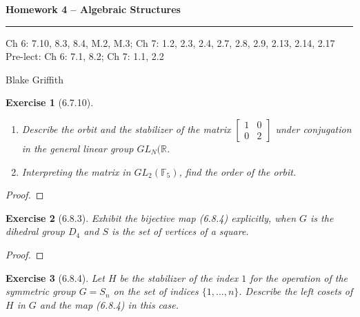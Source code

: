 \documentclass[12pt]{article}
\newtheorem*{exer}{Exercise}
\begin{document}
\textbf{Homework 4 -- Algebraic Structures} \\

\hrule

\begin{minipage}{.80\linewidth}
    \flushleft
    Ch 6: 7.10, 8.3, 8.4, M.2, M.3; Ch 7: 1.2, 2.3, 2.4, 2.7, 2.8, 2.9,
    2.13, 2.14, 2.17 \\
    Pre-lect: Ch 6: 7.1, 8.2; Ch 7: 1.1, 2.2 \\
\end{minipage}
\begin{minipage}{.20\linewidth}
    \flushright
    Blake Griffith
\end{minipage}

\begin{exer}[6.7.10]
    \begin{enumerate}
        \item Describe the orbit and the stabilizer of the matrix
            $\left[
                \begin{array}{cc}
                    1 & 0 \\
                    0 & 2 
                \end{array}
            \right]$
            under conjugation in the general linear group $GL_N (
            \mathbb{R}$.

        \item Interpreting the matrix in $GL_2(\mathbb{F}_5)$, find
            the order of the orbit.
    \end{enumerate}
\end{exer}

\begin{proof}

\end{proof}


\begin{exer}[6.8.3]
    Exhibit the bijective map (6.8.4) explicitly, when $G$ is the
    dihedral group $D_4$ and $S$ is the set of vertices of a square.
\end{exer}

\begin{proof}

\end{proof}


\begin{exer}[6.8.4]
    Let $H$ be the stabilizer of the index $1$ for the operation of the
    symmetric group $G = S_n$ on the set of indices $\{1, \dots, n\}$.
    Describe the left cosets of $H$ in $G$ and the map (6.8.4) in this
    case.
\end{exer}
\end{document}
